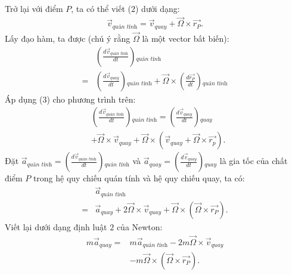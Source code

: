 \begin{multicols}{2}
\begin{align*}
	\end{align*}
	Trở lại với điểm $P$, ta có thể viết ($2$) dưới dạng:
	\begin{align*}
		\overrightarrow{v}\!\!_\textit{quán tính} = \overrightarrow{v}\!\!_{quay} + \overrightarrow{\Omega} \times \overrightarrow{r_P}.
	\end{align*}
	Lấy đạo hàm, ta được (chú ý rằng $\overrightarrow{\Omega}$ là một vector bất biến):
	\begin{align*}
		&\left(\!\!\frac{d\overrightarrow{v}\!\!_\textit{quán tính}}{dt}\!\!\right)\!\!_\textit{quán tính} \\
		= &\left(\!\!\frac{d\overrightarrow{v}\!\!_{quay}}{dt}\!\!\right)\!\!_\textit{quán tính} + \overrightarrow{\Omega} \times \left(\!\!\frac{d\overrightarrow{r_P}}{dt}\!\!\right)\!\!_\textit{quán tính}
	\end{align*}
	Áp dụng ($3$) cho phương trình trên:
	\begin{align*}
		&\left(\!\!\frac{d\overrightarrow{v}\!\!_\textit{quán tính}}{dt}\!\!\right)\!\!_\textit{quán tính} = \left(\!\!\frac{d\overrightarrow{v}\!\!_{quay}}{dt}\!\!\right)\!\!_{quay} \\
		&+ \overrightarrow{\Omega}\times \overrightarrow{v}\!\!_{quay} + \overrightarrow{\Omega}\times\left(\!\!\overrightarrow{v}\!\!_{quay} + \overrightarrow{\Omega}\times\overrightarrow{r_p}\!\!\right).
	\end{align*}
	Đặt $\overrightarrow{a}\!\!_\textit{quán tính} = \left(\!\!\frac{d\overrightarrow{v}\!\!_\textit{quán tính}}{dt}\!\!\right)\!\!_\textit{quán tính}$ và $\overrightarrow{a}\!\!_{quay} = \left(\!\!\frac{d\overrightarrow{v}\!\!_{quay}}{dt}\!\!\right)\!\!_{quay}$ là gia tốc của chất điểm $P$ trong hệ quy chiếu quán tính và hệ quy chiếu quay, ta có:
	\begin{align*}
		&\overrightarrow{a}\!\!_\textit{quán tính} \\
		= &\overrightarrow{a}\!\!_{quay} + 2\overrightarrow{\Omega}\times \overrightarrow{v}\!\!_{quay} + \overrightarrow{\Omega}\times \left(\!\!\overrightarrow{\Omega} \times \overrightarrow{r_P}\!\!\right).
	\end{align*}
	Viết lại dưới dạng định luật $2$ của Newton:
	\begin{align*}
		m \overrightarrow{a}\!\!_{quay} =& m \overrightarrow{a}\!\!_\textit{quán tính} - 2m\overrightarrow{\Omega}\times \overrightarrow{v}\!\!_{quay}\\
		&- m \overrightarrow{\Omega}\times\left(\!\!\overrightarrow{\Omega} \times \overrightarrow{r_P}\!\!\right).

\end{align*}
\end{multicols}
